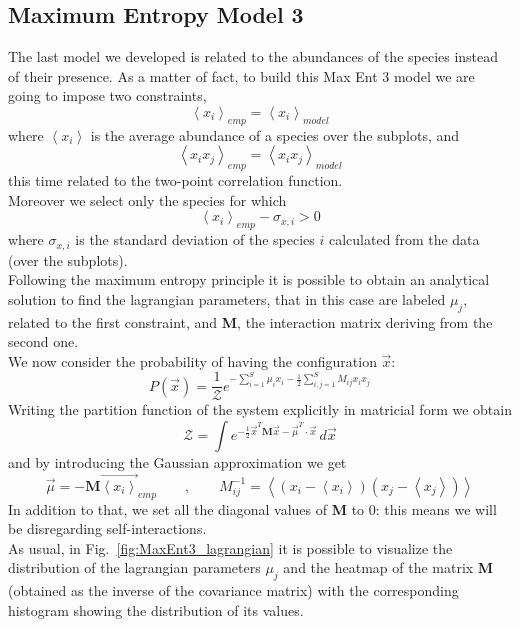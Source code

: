 \documentclass[a4paper,11pt]{article}
\begin{document}
\subsection{Maximum Entropy Model 3}
The last model we developed is related to the abundances of the species instead of their presence. As a matter of fact, to build this Max Ent 3 model we are going to impose two constraints,
\begin{equation}
    \left \langle x_i \right \rangle_{emp} = \left \langle x_i \right \rangle_{model}
\end{equation}
where $\left \langle x_i \right \rangle$ is the average abundance of a species over the subplots, and
\begin{equation}
    \left \langle x_i x_j \right \rangle_{emp} = \left \langle x_i x_j \right \rangle_{model}
\end{equation}
this time related to the two-point correlation function.
\\
Moreover we select only the species for which
\begin{equation}
    \left \langle x_i \right \rangle_{emp} - \sigma_{x,i} > 0
\end{equation}
where $\sigma_{x,i}$ is the standard deviation of the species $i$ calculated from the data (over the subplots).
\\
Following the maximum entropy principle it is possible to obtain an analytical solution to find the lagrangian parameters, that in this case are labeled $\mu_j$, related to the first constraint, and \textbf{M}, the interaction matrix deriving from the second one. 
\\
We now consider the probability of having the configuration $\Vec{x}$:
\begin{equation}
    P(\Vec{x})= \frac{1}{\mathcal{Z}} e^{ -\sum_{i=1}^S \mu_i x_i - \frac{1}{2} \sum_{i,j = 1}^S M_{ij}x_ix_j}
\end{equation}
Writing the partition function of the system explicitly in matricial form we obtain
\begin{equation}
\mathcal{Z}=\int e^{-\frac{1}{2} \Vec{x}^T \mathbf{M} \Vec{x} -\Vec{\mu}^T \cdot \Vec{x}}\, d\Vec{x}
\end{equation}
and by introducing the Gaussian approximation we get
\begin{equation}
    \Vec{\mu} = - \textbf{M} \Vec{\left \langle x_i \right \rangle}_{emp} \qquad , \qquad M_{ij}^{-1} = \left \langle (x_i - \left \langle x_i  \right \rangle)(x_j - \left \langle x_j  \right \rangle) \right \rangle
\end{equation}
In addition to that, we set all the diagonal values of \textbf{M} to $0$: this means we will be disregarding self-interactions.  
\\
As usual, in Fig.~\ref{fig:MaxEnt3_lagrangian} it is possible to visualize the distribution of the lagrangian parameters $\mu_j$ and the heatmap of the matrix \textbf{M} (obtained as the inverse of the covariance matrix) with the corresponding histogram showing the distribution of its values.
\end{document}
